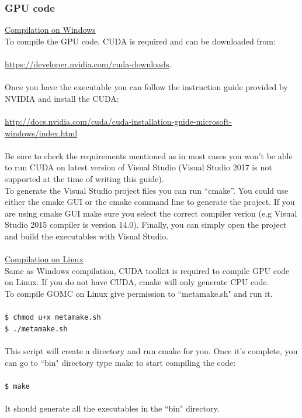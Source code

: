 \subsubsection{GPU code}
\underline{Compilation on Windows}\\
To compile the GPU code, CUDA is required and can be downloaded from:\\\\
\url{https://developer.nvidia.com/cuda-downloads}.\\\\
Once you have the executable you can follow the instruction guide provided by NVIDIA and install the CUDA:\\\\
\url{http://docs.nvidia.com/cuda/cuda-installation-guide-microsoft-windows/index.html}\\\\
Be sure to check the requirements mentioned as in most cases you won't be able to run CUDA on latest version of Visual Studio (Visual Studio 2017 is not supported at the time of writing this guide).\\
To generate the Visual Studio project files you can run ``cmake''. You could use either the cmake GUI or the cmake command line to generate the project. If you are using cmake GUI make sure you select the correct compiler verion (e.g Visual Studio 2015 compiler is version 14.0). Finally, you can simply open the project and build the executables with Visual Studio. \\\\
\underline{Compilation on Linux}\\
Same as Windows compilation, CUDA toolkit is required to compile GPU code on Linux. If you do not have CUDA, cmake will only generate CPU code.\\
To compile GOMC on Linux give permission to ``metamake.sh" and run it.\\\\
\texttt{\$ chmod u+x metamake.sh}\\
\texttt{\$ ./metamake.sh}\\\\
This script will create a directory and run cmake for you. Once it's complete, you can go to ``bin" directory type make to start compiling the code:\\\\
\texttt{\$ make}\\\\
It should generate all the executables in the ``bin" directory.

